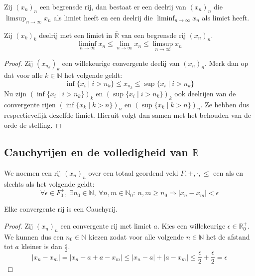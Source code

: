 \documentclass[main.tex]{subfiles}
\begin{document}
\begin{bpr}
  Zij $(x_{n})_{n}$ een begrensde rij, dan bestaat er een deelrij van $(x_{n})_{n}$ die $\limsup_{n\rightarrow \infty} x_{n}$ als limiet heeft en een deelrij die $\liminf_{n\rightarrow \infty} x_{n}$ als limiet heeft.
\end{bpr}

\begin{bpr}
  Zij $(x_{k})_{k}$ deelrij met een limiet in $\bar{\mathbb{R}}$ van een begrensde rij $(x_{n})_{n}$.
  \[ \liminf_{n\rightarrow \infty} x_{n} \le \lim_{n\rightarrow \infty} x_{n} \le \limsup_{n\rightarrow \infty} x_{n} \]

  \begin{proof}
    Zij $(x_{n_{k}})_{k}$ een willekeurige convergente deelij van $(x_{n})_{n}$.
    Merk dan op dat voor alle $k\in \mathbb{N}$ het volgende geldt:
    \[ \inf\{x_{i}\mid i>n_{k}\} \le x_{n_{k}} \le \sup\{x_{i}\mid i>n_{k}\}\]
    Nu zijn $(\inf\{x_{i}\mid i>n_{k}\})_{k}$ en $(\sup\{x_{i}\mid i>n_{k}\})_{k}$ ook deelrijen van de convergente rijen $(\inf\{x_{k}\mid k>n\})_{n}$ en $(\sup\{x_{k}\mid k>n\})_{n}$.
    Ze hebben dus respectievelijk dezelfde limiet.
    Hieruit volgt dan samen met het behouden van de orde de stelling.
  \end{proof}
\end{bpr}


\subsection{Cauchyrijen en de volledigheid van $\mathbb{R}$}
\label{sec:cauchyrijen-en-de}

\begin{de}
  We noemen een rij $(x_{n})_{n}$ over een totaal geordend veld $F,+,\cdot,\le$ een  als en slechts als het volgende geldt:
  \[ \forall \epsilon \in F_{0}^{+},\ \exists n_{0}\in \mathbb{N},\ \forall n,m \in \mathbb{N}_{0}:\ n,m \ge n_{0} \Rightarrow |x_{n}-x_{m}| < \epsilon \]
\end{de}

\begin{bpr}
  \label{pr:convergent-dan-cauchy}
  Elke convergente rij is een Cauchyrij.
  
  \begin{proof}
    Zij $(x_{n})_{n}$ een convergente rij met limiet $a$.
    Kies een willekeurige $\epsilon\in \mathbb{R}_{0}^{+}$.
    We kunnen dus een $n_{0}\in \mathbb{N}$ kiezen zodat voor alle volgende $n\in\mathbb{N}$ het de afstand tot $a$ kleiner is dan $\frac{\epsilon}{2}$.
    \[ |x_{n}-x_{m}| = |x_{n}-a+a-x_{m}| \le |x_{n}-a|+|a-x_{m}| \le \frac{\epsilon}{2}+\frac{\epsilon}{2}=\epsilon \]
  \end{proof}
\end{bpr}
\end{document}
